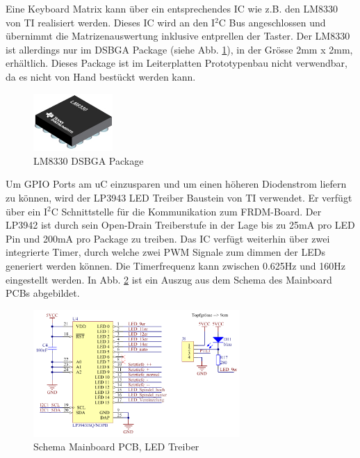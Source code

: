 Eine Keyboard Matrix kann über ein entsprechendes IC wie z.B. den LM8330 von TI realisiert werden. Dieses IC wird an den I$^2$C Bus angeschlossen und übernimmt die Matrizenauswertung inklusive entprellen der Taster. Der LM8330 ist allerdings nur im DSBGA Package (siehe Abb. \ref{fig:DSBGA_Package}), in der Grösse 2mm x 2mm, erhältlich. Dieses Package ist im Leiterplatten Prototypenbau nicht verwendbar, da es nicht von Hand bestückt werden kann.\newline

\begin{figure}[H]
	\includegraphics[width=0.27\textwidth]{Illustrationen/6-Umsetzung/DSBGA_Package.png}
	\caption{LM8330 DSBGA Package \protect\cite{DSBGA_Package}}
	\label{fig:DSBGA_Package}
\end{figure}

Um GPIO Ports am uC einzusparen und um einen höheren Diodenstrom liefern zu können, wird der LP3943 LED Treiber Baustein von TI verwendet. Er verfügt über ein I$^{2}$C Schnittstelle für die Kommunikation zum FRDM-Board. Der LP3942 ist durch sein Open-Drain Treiberstufe in der Lage bis zu 25mA pro LED Pin und 200mA pro Package zu treiben. Das IC verfügt weiterhin über zwei integrierte Timer, durch welche zwei PWM Signale zum dimmen der LEDs generiert werden können. Die Timerfrequenz kann zwischen 0.625Hz und 160Hz eingestellt werden. In Abb. \ref{fig:Mainboard_LED_Driver_LP3943} ist ein Auszug aus dem Schema des Mainboard PCBs abgebildet. 

\begin{figure}[H]
	\includegraphics[width=0.7\textwidth]{Illustrationen/6-Umsetzung/Schema_Mainboard_LP39431.png}
	\caption{Schema Mainboard PCB, LED Treiber}
	\label{fig:Mainboard_LED_Driver_LP3943}
\end{figure}

